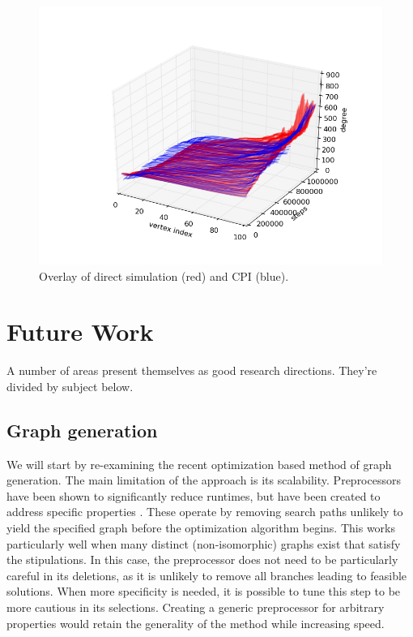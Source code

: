 \documentclass[11pt]{article}
\begin{document}
\begin{figure}[h!]
  \centering
  \includegraphics[width=0.6\linewidth]{paCPI}
  \caption{Overlay of direct simulation (red) and CPI (blue).}
  \label{fig:paCPI}
\end{figure}
\section{Future Work}
A number of areas present themselves as good research directions. They're divided by subject below.
\subsection{Graph generation}
\indent We will start by re-examining the recent optimization based method of graph generation. The main limitation of the approach is its scalability. Preprocessors have been shown to significantly reduce runtimes, but have been created to address specific properties \cite{Gounaris2011}. These operate by removing search paths unlikely to yield the specified graph before the optimization algorithm begins. This works particularly well when many distinct (non-isomorphic) graphs exist that satisfy the stipulations. In this case, the preprocessor does not need to be particularly careful in its deletions, as it is unlikely to remove all branches leading to feasible solutions. When more specificity is needed, it is possible to tune this step to be more cautious in its selections. Creating a generic preprocessor for arbitrary properties would retain the generality of the method while increasing speed. \\
\end{document}
